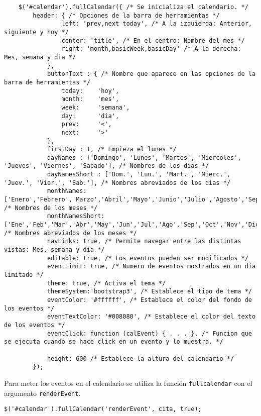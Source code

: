 \medskip
\begin{lstlisting}
	$('#calendar').fullCalendar({ /* Se inicializa el calendario. */
		header: { /* Opciones de la barra de herramientas */
				left: 'prev,next today', /* A la izquierda: Anterior, siguiente y hoy */
				center: 'title', /* En el centro: Nombre del mes */
				right: 'month,basicWeek,basicDay' /* A la derecha: Mes, semana y dia */
			},
			buttonText : { /* Nombre que aparece en las opciones de la barra de herramientas */
				today:    'hoy',
				month:    'mes',
				week:     'semana',
				day:      'dia',
				prev:	  '<',
				next:	  '>'
			},
			firstDay : 1, /* Empieza el lunes */
			dayNames : ['Domingo', 'Lunes', 'Martes', 'Miercoles', 'Jueves', 'Viernes', 'Sabado'], /* Nombres de los dias */
			dayNamesShort : ['Dom.', 'Lun.', 'Mart.', 'Mierc.', 'Juev.', 'Vier.', 'Sab.'], /* Nombres abreviados de los dias */
			monthNames: ['Enero','Febrero','Marzo','Abril','Mayo','Junio','Julio','Agosto','Septiembre','Octubre','Noviembre','Diciembre'], /* Nombres de los meses */
			monthNamesShort: ['Ene','Feb','Mar','Abr','May','Jun','Jul','Ago','Sep','Oct','Nov','Dic'], /* Nombres abreviados de los meses */
			navLinks: true, /* Permite navegar entre las distintas vistas: Mes, semana y dia */
			editable: true, /* Los eventos pueden ser modificados */
			eventLimit: true, /* Numero de eventos mostrados en un dia limitado */
			theme: true, /* Activa el tema */
			themeSystem:'bootstrap3', /* Establece el tipo de tema */
			eventColor: '#ffffff', /* Establece el color del fondo de los eventos */
			eventTextColor: '#008080', /* Establece el color del texto de los eventos */
			eventClick: function (calEvent) { . . . }, /* Funcion que se ejecuta cuando se hace click en un evento y lo muestra. */

			height: 600 /* Establece la altura del calendario */
		});
\end{lstlisting}


Para meter los eventos en el calendario se utiliza la función \texttt{fullcalendar} con el argumento \texttt{renderEvent}.


\medskip
\begin{lstlisting}
$('#calendar').fullCalendar('renderEvent', cita, true);
\end{lstlisting}


